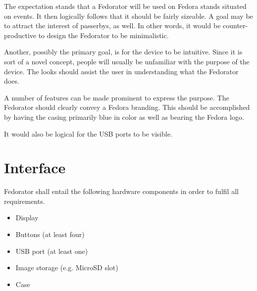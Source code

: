         The expectation stands that a Fedorator will be used on Fedora stands situated on events.  It then logically follows that it should be fairly sizeable.  A goal may be to attract the interest of passerbys, as well.  In other words, it would be counter-productive to design the Fedorator to be minimalistic.
        
        Another, possibly the primary goal, is for the device to be intuitive.  Since it is sort of a novel concept, people will usually be unfamiliar with the purpose of the device.  The looks should assist the user in understanding what the Fedorator does.
        
        A number of features can be made prominent to express the purpose.  The Fedorator should clearly convey a Fedora branding.  This should be accomplished by having the casing primarily blue in color as well as bearing the Fedora logo.
        
        
        It would also be logical for the USB ports to be visible.
        
        
        
    \section{Interface}
        \todo{}
        
        
        
        Fedorator shall entail the following hardware components in order to fulfil all requirements.
        \begin{itemize}
            \item Display
            \item Buttons (at least four)
            \item USB port (at least one)
            \item Image storage (e.g. MicroSD slot)
            \item Case
        \end{itemize}
        
        \blind[1]
